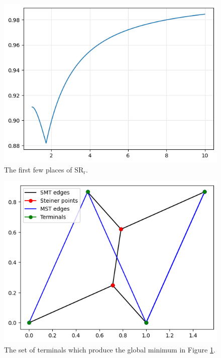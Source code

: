 \documentclass{mpaper}
\begin{document}
\begin{figure}[h!]
  \begin{center}
  \includegraphics[scale=0.5]{plot10.png}
  \end{center}
  \caption{\label{fig:11} The first few places of $\operatorname{SR_{r}}$.}
\end{figure}

\begin{figure}[h!]
  \begin{center}
  \includegraphics[scale=0.5]{plot11.png}
  \end{center}
  \caption{\label{fig:12} The set of terminals which produce the global minimum in Figure \ref{fig:11}.}
\end{figure}
\end{document}
